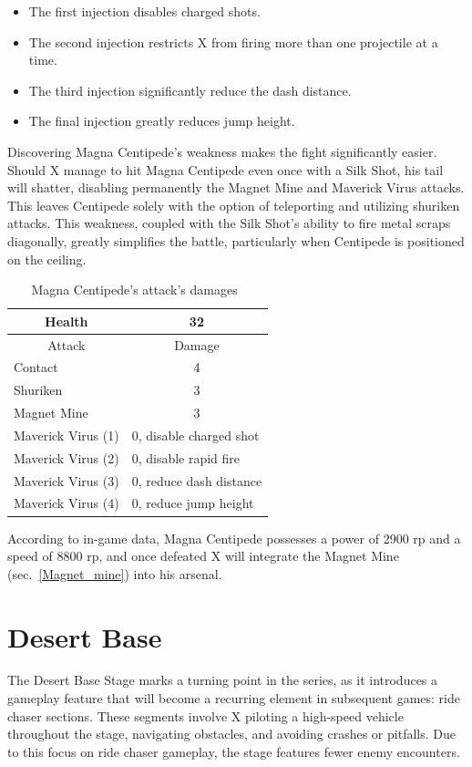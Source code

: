 \begin{itemize}
\item The first injection disables charged shots.
\item  The second injection restricts X from firing more than one projectile at a time.
\item The third injection significantly reduce the dash distance.
\item The final injection greatly reduces jump height.
\end{itemize}

Discovering Magna Centipede's weakness makes the fight significantly easier. Should X manage to hit Magna Centipede even once with a Silk Shot, his tail will shatter, disabling permanently the Magnet Mine and Maverick Virus attacks. This leaves Centipede solely with the option of teleporting and utilizing shuriken attacks. This weakness, coupled with the Silk Shot's ability to fire metal scraps diagonally, greatly simplifies the battle, particularly when Centipede is positioned on the ceiling.

\begin{table}[htp]
	\centering
	\begin{tabular}[h]{l c}
		\toprule
		\multicolumn{1}{c}{Health}  & 32 \\
		\midrule
		\multicolumn{1}{c}{Attack} & \multicolumn{1}{c}{Damage}\\
		Contact & 4 \\
		Shuriken & 3\\
		Magnet Mine& 3\\
		Maverick Virus (1) & \multicolumn{1}{l}{0, disable charged shot}\\
		Maverick Virus (2) & \multicolumn{1}{l}{0, disable rapid fire}\\
		Maverick Virus (3) & \multicolumn{1}{l}{0, reduce dash distance}\\
		Maverick Virus (4) & \multicolumn{1}{l}{0, reduce jump height}\\
		\bottomrule
	\end{tabular}
	\caption{Magna Centipede's attack's damages~\cite{wiki:Magna_centipede,book:Compendium}}
\end{table}
According to in-game data, Magna Centipede possesses a power of 2900 rp and a speed of 8800 rp, and once defeated X will integrate the Magnet Mine (sec.~\ref{Magnet_mine}) into his arsenal.



\section{Desert Base}
The Desert Base Stage marks a turning point in the series, as it introduces a gameplay feature that will become a recurring element in subsequent games: ride chaser sections. These segments involve X piloting a high-speed vehicle throughout the stage, navigating obstacles, and avoiding crashes or pitfalls. Due to this focus on ride chaser gameplay, the stage features fewer enemy encounters.


